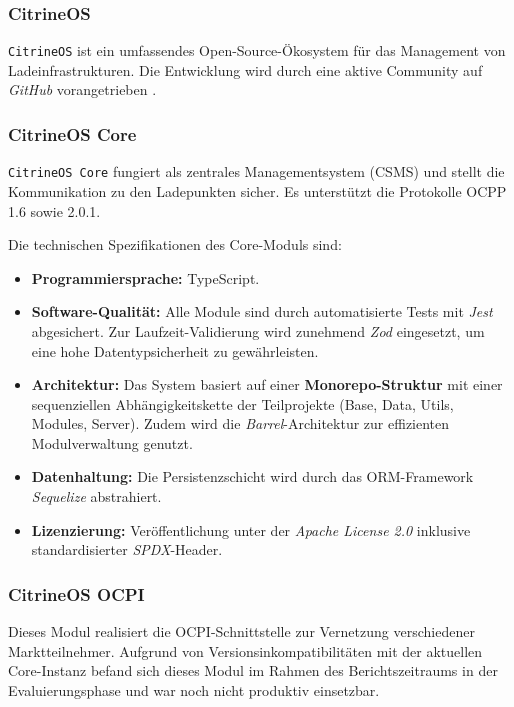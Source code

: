 \documentclass[12pt,a4paper]{report}
\begin{document}
\subsubsection{CitrineOS}
\texttt{CitrineOS} ist ein umfassendes Open-Source-Ökosystem für das Management von Ladeinfrastrukturen. Die Entwicklung wird durch eine aktive Community auf \textit{GitHub} vorangetrieben \cite{CitrineOS}.

\subsubsection{CitrineOS Core}
\texttt{CitrineOS Core} fungiert als zentrales Managementsystem (\gls{CSMS}) und stellt die Kommunikation zu den Ladepunkten sicher. Es unterstützt die Protokolle \gls{OCPP} 1.6 sowie 2.0.1.

Die technischen Spezifikationen des Core-Moduls sind:
\begin{itemize}
    \item \textbf{Programmiersprache:} TypeScript.
    \item \textbf{Software-Qualität:} Alle Module sind durch automatisierte Tests mit \textit{Jest} abgesichert. Zur Laufzeit-Validierung wird zunehmend \textit{Zod} eingesetzt, um eine hohe Datentypsicherheit zu gewährleisten.
    \item \textbf{Architektur:} Das System basiert auf einer \textbf{Monorepo-Struktur} mit einer sequenziellen Abhängigkeitskette der Teilprojekte (Base, Data, Utils, Modules, Server). Zudem wird die \textit{Barrel}-Architektur zur effizienten Modulverwaltung genutzt.
    \item \textbf{Datenhaltung:} Die Persistenzschicht wird durch das ORM-Framework \textit{Sequelize} abstrahiert.
    \item \textbf{Lizenzierung:} Veröffentlichung unter der \textit{Apache License 2.0} inklusive standardisierter \textit{SPDX}-Header.
\end{itemize}

\subsubsection{CitrineOS OCPI}
Dieses Modul realisiert die \gls{OCPI}-Schnittstelle zur Vernetzung verschiedener Marktteilnehmer. Aufgrund von Versionsinkompatibilitäten mit der aktuellen Core-Instanz befand sich dieses Modul im Rahmen des Berichtszeitraums in der Evaluierungsphase und war noch nicht produktiv einsetzbar.
\end{document}
